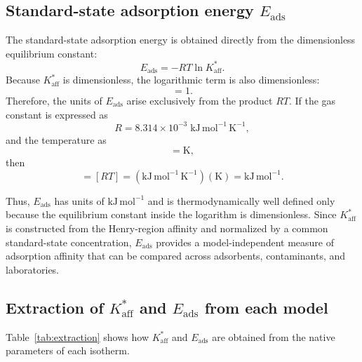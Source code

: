 \documentclass[journal=jacsat,manuscript=article]{achemso}
\begin{document}
\subsection{Standard-state adsorption energy $E_{\mathrm{ads}}$}
\label{sec:Eads}

The standard-state adsorption energy is obtained directly from the dimensionless equilibrium constant:
\begin{equation}
	E_{\mathrm{ads}} = 
	- RT \ln K_{\mathrm{aff}}^{\ast}.
	\label{eq:Eads}
\end{equation}
Because $K_{\mathrm{aff}}^{\ast}$ is dimensionless, the logarithmic term is also dimensionless:
\begin{equation}
	[\ln K_{\mathrm{aff}}^{\ast}] = 1.
\end{equation}
Therefore, the units of $E_{\mathrm{ads}}$ arise exclusively from the product $RT$. If the gas constant is expressed as
\begin{equation}
	R = 8.314 \times 10^{-3}\; \mathrm{kJ\,mol^{-1}\,K^{-1}},
\end{equation}
and the temperature as
\begin{equation}
	[T] = \mathrm{K},
\end{equation}
then
\begin{equation}
	[E_{\mathrm{ads}}]
	=
	[RT]
	=
	\left(\mathrm{kJ\,mol^{-1}\,K^{-1}}\right)
	\left(\mathrm{K}\right)
	=
	\mathrm{kJ\,mol^{-1}}.
\end{equation}

Thus, $E_{\mathrm{ads}}$ has units of $\mathrm{kJ\,mol^{-1}}$ and is thermodynamically well defined only because the equilibrium constant inside the logarithm is dimensionless. Since $K_{\mathrm{aff}}^{\ast}$ is constructed from the Henry-region affinity and normalized by a common standard-state concentration, $E_{\mathrm{ads}}$ provides a model-independent measure of adsorption affinity that can be compared across adsorbents, contaminants, and laboratories.

	\subsection{Extraction of $K_{\mathrm{aff}}^{\ast}$ and $E_{\mathrm{ads}}$ from each model}
	\label{sec:extraction}

	Table~\ref{tab:extraction} shows how $K_{\mathrm{aff}}^{\ast}$ and $E_{\mathrm{ads}}$ are obtained from the native parameters of each isotherm.
\end{document}
